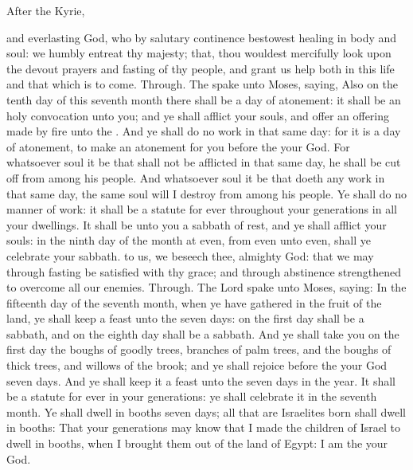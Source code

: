 \begin{rubric}
    After the Kyrie,
\end{rubric}
\collect
{} and everlasting God, who by salutary continence bestowest healing in body and soul: we humbly entreat thy majesty; that, thou wouldest mercifully look upon the devout prayers and fasting of thy people, and grant us help both in this life and that which is to come. Through.
 The  spake unto Moses, saying, Also on the tenth day of this seventh month there shall be a day of atonement: it shall be an holy convocation unto you; and ye shall afflict your souls, and offer an offering made by fire unto the . And ye shall do no work in that same day: for it is a day of atonement, to make an atonement for you before the  your God. For whatsoever soul it be that shall not be afflicted in that same day, he shall be cut off from among his people. And whatsoever soul it be that doeth any work in that same day, the same soul will I destroy from among his people. Ye shall do no manner of work: it shall be a statute for ever throughout your generations in all your dwellings. It shall be unto you a sabbath of rest, and ye shall afflict your souls: in the ninth day of the month at even, from even unto even, shall ye celebrate your sabbath.
\collect
{} to us, we beseech thee, almighty God: that we may through fasting be satisfied with thy grace; and through abstinence strengthened to overcome all our enemies. Through.
 The Lord spake unto Moses, saying: In the fifteenth day of the seventh month, when ye have gathered in the fruit of the land, ye shall keep a feast unto the  seven days: on the first day shall be a sabbath, and on the eighth day shall be a sabbath. And ye shall take you on the first day the boughs of goodly trees, branches of palm trees, and the boughs of thick trees, and willows of the brook; and ye shall rejoice before the  your God seven days. And ye shall keep it a feast unto the  seven days in the year. It shall be a statute for ever in your generations: ye shall celebrate it in the seventh month. Ye shall dwell in booths seven days; all that are Israelites born shall dwell in booths: That your generations may know that I made the children of Israel to dwell in booths, when I brought them out of the land of Egypt: I am the  your God.


